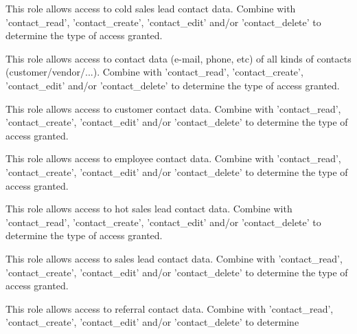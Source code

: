 \begin{description}[style=nextline]
                         This role allows access to cold sales lead contact data.
                         Combine with 'contact\_read', 'contact\_create', 'contact\_edit' and/or 'contact\_delete' to determine
                         the type of access granted.
\item [contact\_class\_contact] \htmlspacing 
                         This role allows access to contact data (e-mail, phone, etc) of all kinds of contacts (customer/vendor/...).
                         Combine with 'contact\_read', 'contact\_create', 'contact\_edit' and/or 'contact\_delete' to determine
                         the type of access granted.
\item [contact\_class\_customer] \htmlspacing 
                         This role allows access to customer contact data.
                         Combine with 'contact\_read', 'contact\_create', 'contact\_edit' and/or 'contact\_delete' to determine
                         the type of access granted.
\item [contact\_class\_employee] \htmlspacing 
                         This role allows access to employee contact data.
                         Combine with 'contact\_read', 'contact\_create', 'contact\_edit' and/or 'contact\_delete' to determine
                         the type of access granted.
\item [contact\_class\_hot\_lead] \htmlspacing 
                         This role allows access to hot sales lead contact data.
                         Combine with 'contact\_read', 'contact\_create', 'contact\_edit' and/or 'contact\_delete' to determine
                         the type of access granted.
\item [contact\_class\_lead] \htmlspacing 
                         This role allows access to sales lead contact data.
                         Combine with 'contact\_read', 'contact\_create', 'contact\_edit' and/or 'contact\_delete' to determine
                         the type of access granted.
\item [contact\_class\_referral] \htmlspacing 
                         This role allows access to referral contact data.
                         Combine with 'contact\_read', 'contact\_create', 'contact\_edit' and/or 'contact\_delete' to determine

\end{description}

